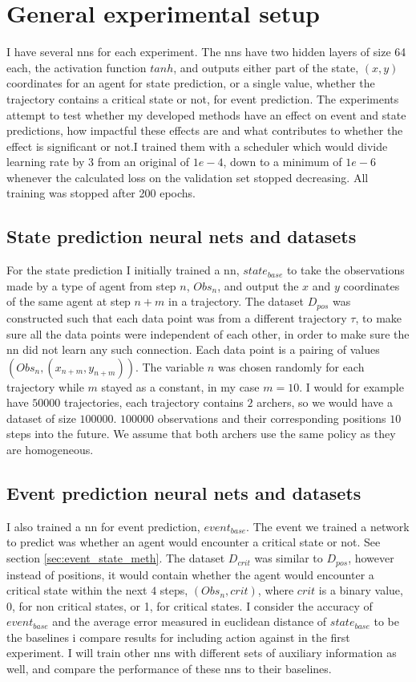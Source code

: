 \documentclass[UKenglish]{uiomasterthesis}
\begin{document}
\section{General experimental setup}
I have several \acp{nn} for each experiment. The \acp{nn} have two hidden layers of size 64 each, the activation function $tanh$, and outputs either part of the state, $(x,y)$ coordinates for an agent for state prediction, or a single value, whether the trajectory contains a critical state or not, for event prediction. The experiments attempt to test whether my developed methods have an effect on event and state predictions, how impactful these effects are and what contributes to whether the effect is significant or not.I trained them with a scheduler which would divide learning rate by $3$ from an original of $1e-4$, down to a minimum of $1e-6$ whenever the calculated loss on the validation set stopped decreasing. All training was stopped after 200 epochs.

\subsection{State prediction neural nets and datasets}
For the state prediction I initially trained a \ac{nn}, $state_{base}$ to take the observations made by a type of agent from step $n$, $Obs_n$, and output the $x$ and $y$ coordinates of the same agent at step $n+m$ in a trajectory. The dataset $D_{pos}$ was constructed such that each data point was from a different trajectory $\tau$, to make sure all the data points were independent of each other, in order to make sure the \ac{nn} did not learn any such connection. Each data point is a pairing of values $(Obs_n, (x_{n+m},y_{n+m}))$. The variable $n$ was chosen randomly for each trajectory while $m$ stayed as a constant, in my case $m=10$. I would for example have $50000$ trajectories, each trajectory contains $2$ archers, so we would have a dataset of size $100000$. $100000$ observations and their corresponding positions $10$ steps into the future. We assume that both archers use the same policy as they are homogeneous.

\subsection{Event prediction neural nets and datasets}
I also trained a \ac{nn} for event prediction, $event_{base}$. The event we trained a network to predict was whether an agent would encounter a critical state or not. See section \ref{sec:event_state_meth}. The dataset $D_{crit}$ was similar to $D_{pos}$, however instead of positions, it would contain whether the agent would encounter a critical state within the next $4$ steps, $(Obs_n, crit)$, where $crit$ is a binary value, 0, for non critical states, or 1, for critical states.
I consider the accuracy of $event_{base}$ and the average error measured in euclidean distance of $state_{base}$ to be the baselines i compare results for including action against in the first experiment. I will train other \acp{nn} with different sets of auxiliary information as well, and compare the performance of these \acp{nn} to their baselines.
\end{document}
